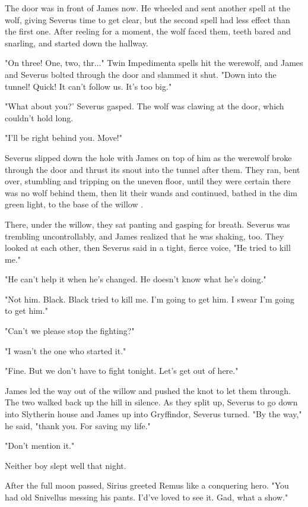 \documentclass[a4paper,11pt]{article}
\begin{document}
The door was in front of James now. He wheeled and sent another spell at the wolf, giving Severus time to get clear, but the second spell had less effect than the first one. After reeling for a moment, the wolf faced them, teeth bared and snarling, and started down the hallway.

"On three! One, two, thr..." Twin Impedimenta spells hit the werewolf, and James and Severus bolted through the door and slammed it shut. "Down into the tunnel! Quick! It can't follow us. It's too big."

"What about you?' Severus gasped. The wolf was clawing at the door, which couldn't hold long.

"I'll be right behind you. Move!"

Severus slipped down the hole with James on top of him as the werewolf broke through the door and thrust its snout into the tunnel after them. They ran, bent over, stumbling and tripping on the uneven floor, until they were certain there was no wolf behind them, then lit their wands and continued, bathed in the dim green light, to the base of the willow .

There, under the willow, they sat panting and gasping for breath. Severus was trembling uncontrollably, and James realized that he was shaking, too. They looked at each other, then Severus said in a tight, fierce voice, "He tried to kill me."

"He can't help it when he's changed. He doesn't know what he's doing."

"Not him. Black. Black tried to kill me. I'm going to get him. I swear I'm going to get him."

"Can't we please stop the fighting?"

"I wasn't the one who started it."

"Fine. But we don't have to fight tonight. Let's get out of here."

James led the way out of the willow and pushed the knot to let them through. The two walked back up the hill in silence. As they split up, Severus to go down into Slytherin house and James up into Gryffindor, Severus turned. "By the way," he said, "thank you. For saving my life."

"Don't mention it."

Neither boy slept well that night.

After the full moon passed, Sirius greeted Remus like a conquering hero. "You had old Snivellus messing his pants. I'd've loved to see it. Gad, what a show."
\end{document}

